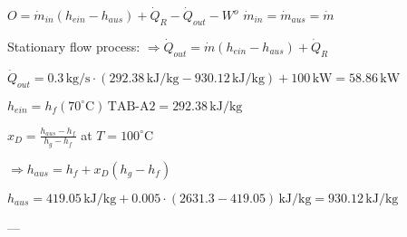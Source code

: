 \( O = \dot{m}_{in} (h_{ein} - h_{aus}) + \dot{Q}_R - \dot{Q}_{out} - W^o \)  
\( \dot{m}_{in} = \dot{m}_{aus} = \dot{m} \)  

Stationary flow process:  
\( \Rightarrow \dot{Q}_{out} = \dot{m} (h_{ein} - h_{aus}) + \dot{Q}_R \)  

\( \dot{Q}_{out} = 0.3 \, \text{kg/s} \cdot (292.38 \, \text{kJ/kg} - 930.12 \, \text{kJ/kg}) + 100 \, \text{kW} = 58.86 \, \text{kW} \)  

\( h_{ein} = h_f (70^\circ \text{C}) \, \text{TAB-A2} = 292.38 \, \text{kJ/kg} \)  

\( x_D = \frac{h_{aus} - h_f}{h_g - h_f} \) at \( T = 100^\circ \text{C} \)  

\( \Rightarrow h_{aus} = h_f + x_D (h_g - h_f) \)  

\( h_{aus} = 419.05 \, \text{kJ/kg} + 0.005 \cdot (2631.3 - 419.05) \, \text{kJ/kg} = 930.12 \, \text{kJ/kg} \)  

---